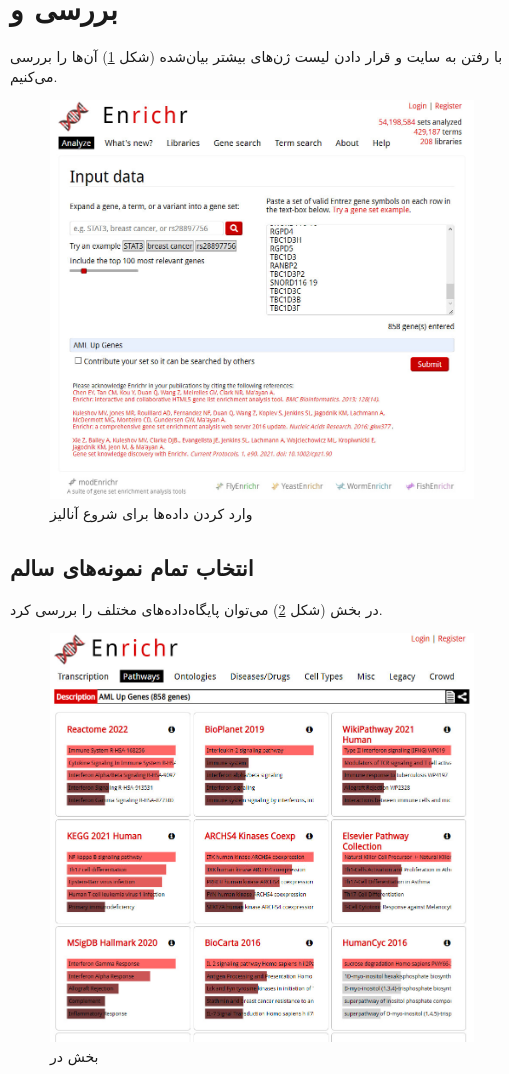 \documentclass{article}
\begin{document}
\section{بررسی  و }
با رفتن به سایت \href{https://maayanlab.cloud/Enrichr/}{} و قرار دادن لیست ژن‌های بیشتر بیان‌شده (شکل \ref{fig:enrichr}) آن‌‌ها را بررسی می‌کنیم.
\begin{figure}[h!]
	\centering
	\includegraphics[width=0.5\columnwidth]{figs/enrichr.jpg}
	\caption{وارد کردن داده‌ها برای شروع آنالیز}
	\label{fig:enrichr}
\end{figure}

\subsection{انتخاب تمام نمونه‌های سالم}
در بخش  (شکل \ref{fig:enrichr-pathways}) می‌توان پایگاه‌داده‌های  مختلف را بررسی کرد.
\begin{figure}[h!]
	\centering
	\includegraphics[width=0.5\columnwidth]{figs/enrichr-pathways.jpg}
	\caption{بخش  در }
	\label{fig:enrichr-pathways}
\end{figure}
\end{document}
